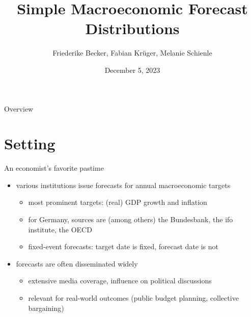 \documentclass[en]{sdqbeamer}
\title[Simple Prediction Intervals]{Simple Macroeconomic Forecast Distributions}
\subtitle{}
\author[Friederike Becker, Fabian Krüger, Melanie Schienle]{Friederike Becker, Fabian Krüger, Melanie Schienle}
\date[05.\,12.\,2023]{December 5, 2023}
\begin{document}
 
\KITtitleframe

\begin{frame}{Overview}
\tableofcontents
\end{frame}

\section{Setting}


\begin{frame}{An economist's favorite pastime}
	\begin{itemize}
	    \item various institutions issue forecasts for annual macroeconomic targets
     \begin{itemize}
        \item most prominent targets: (real) GDP growth and inflation
        \item for Germany, sources are (among others) the Bundesbank, the ifo institute, the OECD
         \item fixed-event forecasts: target date is fixed, forecast date is not
     \end{itemize}
     \item forecasts are often disseminated widely
     \begin{itemize}
         \item extensive media coverage, influence on political discussions
         \item relevant for real-world outcomes (public budget planning, collective bargaining)
     \end{itemize}
	\end{itemize}
\end{frame}
\end{document}
